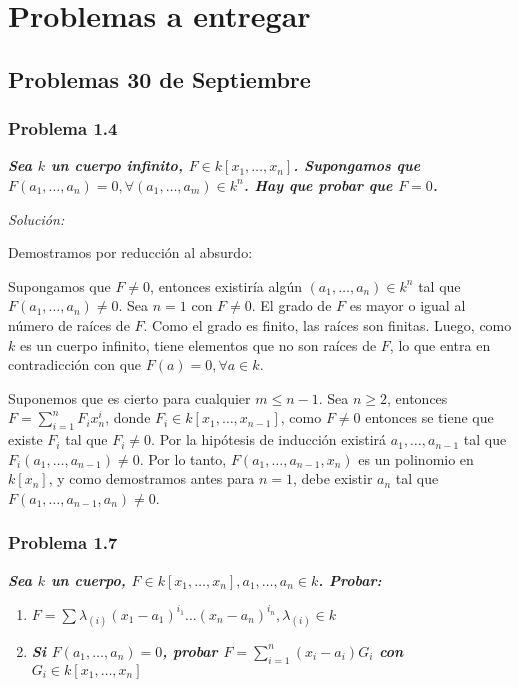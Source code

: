 \chapter{Problemas a entregar}

\section{Problemas 30 de Septiembre}

\subsection{Problema 1.4}

\textbf{\textit{Sea $k$ un cuerpo infinito, $F\in k[x_1, \dots , x_n]$. Supongamos que $F(a_1, \dots , a_n ) = 0, \forall (a_1, \dots , a_m) \in k^n$. Hay que probar que $F=0$.}}


\textit{Solución: }
\vspace{2mm}


Demostramos por reducción al absurdo:


Supongamos que $F\neq 0$, entonces existiría algún $(a_1,\dots,a_n)\in k^n$ tal que $F(a_1,\dots ,a_n)\neq 0$.
Sea $n=1$ con $F\neq 0$. El grado de $F$ es  mayor o igual al número de raíces de $F$. Como el grado es finito, las raíces son finitas.
Luego, como $k$ es un cuerpo infinito, tiene elementos que no son raíces de $F$, lo que entra en contradicción con que $F(a)=0, \forall a \in k$.

Suponemos que es cierto para cualquier $m\le n-1$. Sea $n\ge 2$, entonces $F=\sum_{i=1}^nF_ix^i_n$, donde $F_i \in k[x_1,\dots , x_{n-1}]$, como
$F\neq 0$ entonces se tiene que existe $F_i$ tal que $F_i\neq 0$. Por la hipótesis de inducción existirá $a_1,\dots,a_{n-1}$ tal que $F_i(a_1,\dots,a_{n-1})\neq 0$.
Por lo tanto, $F(a_1,\dots ,a_{n-1},x_n)$ es un polinomio en $k[x_n]$, y como demostramos antes para $n=1$, debe existir $a_n$ tal que $F(a_1,\dots , a_{n-1},a_n)\neq 0$.


\subsection{Problema 1.7}

\textbf{\textit{ Sea $k$ un cuerpo, $F\in k[x_1, \dots , x_n], a_1, \dots , a_n \in k$. Probar:}}

\begin{enumerate}
\item \textbf{\textit{$F=\sum \lambda_{(i)}(x_1-a_1)^{i_1}\dots(x_n-a_n)^{i_n}, \lambda_{(i)}\in k$ }}
\item \textbf{\textit{Si $F(a_1,\dots,a_n) = 0$, probar $F=\sum_{i=1}^n(x_i-a_i)G_i$ con $G_i \in k[x_1,\dots ,x_n]$}}
\end{enumerate}

